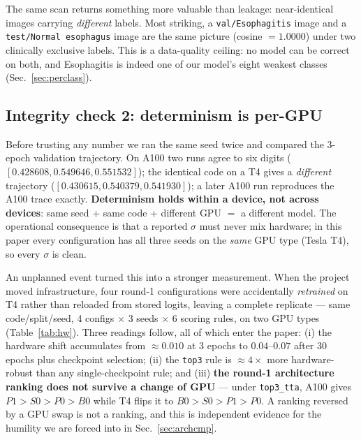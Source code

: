 \documentclass[11pt,a4paper]{article}
\begin{document}
The same scan returns something more valuable than leakage: near-identical
images carrying \emph{different} labels. Most striking, a \texttt{val/Esophagitis}
image and a \texttt{test/Normal esophagus} image are the same picture
(cosine $=1.0000$) under two clinically exclusive labels. This is a data-quality
ceiling: no model can be correct on both, and Esophagitis is indeed one of our
model's eight weakest classes (Sec.~\ref{sec:perclass}).

\subsection{Integrity check 2: determinism is per-GPU}
\label{sec:hw}
Before trusting any number we ran the same seed twice and compared the 3-epoch
validation trajectory. On A100 two runs agree to six digits
($[0.428608, 0.549646, 0.551532]$); the identical code on a T4 gives a
\emph{different} trajectory ($[0.430615, 0.540379, 0.541930]$); a later A100 run
reproduces the A100 trace exactly. \textbf{Determinism holds within a device,
not across devices}: same seed + same code + different GPU $=$ a different model.
The operational consequence is that a reported $\sigma$ must never mix hardware;
in this paper every configuration has all three seeds on the \emph{same} GPU
type (Tesla T4), so every $\sigma$ is clean.

An unplanned event turned this into a stronger measurement. When the project
moved infrastructure, four round-1 configurations were accidentally
\emph{retrained} on T4 rather than reloaded from stored logits, leaving a
complete replicate --- same code/split/seed, 4 configs $\times$ 3 seeds
$\times$ 6 scoring rules, on two GPU types (Table~\ref{tab:hw}). Three readings
follow, all of which enter the paper: (i) the hardware shift accumulates from
$\approx0.010$ at 3 epochs to $0.04$--$0.07$ after 30 epochs plus checkpoint
selection; (ii) the \texttt{top3} rule is $\approx4\times$ more hardware-robust
than any single-checkpoint rule; and (iii) \textbf{the round-1 architecture
ranking does not survive a change of GPU} --- under \texttt{top3\_tta}, A100
gives $P1>S0>P0>B0$ while T4 flips it to $B0>S0>P1>P0$. A ranking reversed by a
GPU swap is not a ranking, and this is independent evidence for the humility we
are forced into in Sec.~\ref{sec:archcmp}.
\end{document}
